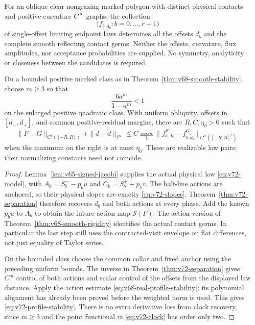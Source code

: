 \begin{theorem}
\label{thm:v72-rigidity}
For an oblique clear nongrazing marked polygon with distinct physical
contacts and positive-curvature $C^\infty$ graphs, the collection
\[
 \bigl(f_{b,d_b}:b=0,\ldots,r-1\bigr)
\]
of single-offset limiting endpoint laws determines all the offsets
$d_b$ and the complete smooth reflecting contact germs.  Neither the
offsets, curvature, flux amplitudes, nor acceptance probabilities are
supplied.  No symmetry, analyticity or closeness between the candidates
is required.

On a bounded positive marked class as in
Theorem~\ref{thm:v68-smooth-stability}, choose $m\ge3$ so that
\[
 \frac{6a^m}{1-a^m}<1
\]
on the enlarged positive quadratic class.  With uniform obliquity,
offsets in $[d_-,d_+]$, and common positive-residual margins, there are
$R,C,\eta_0>0$ such that
\begin{equation}\label{eq:v72-profile-stability}
 \|F-G\|_{C^0([-R,R])}+\|d-\widetilde d\|_{\ell^\infty}
 \le C\max_b\|f^F_{b,d_b}-f^G_{b,\widetilde d_b}\|_{C^m([-R,R]^2)}
\end{equation}
when the maximum on the right is at most $\eta_0$.  These are realizable
law pairs; their normalizing constants need not coincide.
\end{theorem}
\begin{proof}
Lemma~\ref{lem:v65-signed-jacobi} supplies the actual physical law
\eqref{eq:v72-model}, with $A_b=S_b^--p_bu$ and $C_b=S_b^++p_bv$.
The half-line actions are anchored, so their physical slopes are exactly
\eqref{eq:v72-slopes}.  Theorem~\ref{thm:v72-separation} therefore
recovers $d_b$ and both actions at every phase.  Add the known $p_bu$
to $A_b$ to obtain the future action map $\mathcal S(F)$.
The action version of Theorem~\ref{thm:v68-smooth-rigidity} identifies
the actual contact germs.  In particular the last step still uses the
contracted-visit envelope on flat differences, not just equality of
Taylor series.

On the bounded class choose the common collar and fixed anchor using
the preceding uniform bounds.  The inverse in
Theorem~\ref{thm:v72-separation} gives $C^m$ control of both actions
and scalar control of the offsets from the displayed law distance.
Apply the action estimate \eqref{eq:v68-real-profile-stability}; its
polynomial alignment has already been proved before the weighted norm
is used.  This gives \eqref{eq:v72-profile-stability}.  There is no extra
derivative loss from clock recovery, since $m\ge3$ and the point
functional in \eqref{eq:v72-clock} has order only two.
\end{proof}

